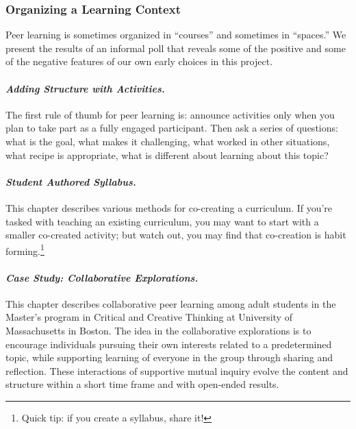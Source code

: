 \hypertarget{organizing-a-learning-context}{%
\subsubsection{Organizing a Learning
Context}\label{organizing-a-learning-context}}

Peer learning is sometimes organized in ``courses'' and sometimes in
``spaces.'' We present the results of an informal poll that reveals some
of the positive and some of the negative features of our own early
choices in this project.

\hypertarget{adding-structure-with-activities.}{%
\paragraph{\texorpdfstring{\emph{Adding Structure with
Activities.}}{Adding Structure with Activities.}}\label{adding-structure-with-activities.}}

The first rule of thumb for peer learning is: announce activities only
when you plan to take part as a fully engaged participant. Then ask a
series of questions: what is the goal, what makes it challenging, what
worked in other situations, what recipe is appropriate, what is
different about learning about this topic?

\hypertarget{student-authored-syllabus.}{%
\paragraph{\texorpdfstring{\emph{Student Authored
Syllabus.}}{Student Authored Syllabus.}}\label{student-authored-syllabus.}}

This chapter describes various methods for co-creating a curriculum. If
you're tasked with teaching an existing curriculum, you may want to
start with a smaller co-created activity; but watch out, you may find
that co-creation is habit forming.\footnote{Quick tip: if you create a
  syllabus, share it!}

\hypertarget{case-study-collaborative-explorations.}{%
\paragraph{\texorpdfstring{\emph{Case Study: Collaborative
Explorations.}}{Case Study: Collaborative Explorations.}}\label{case-study-collaborative-explorations.}}

This chapter describes collaborative peer learning among adult students
in the Master's program in Critical and Creative Thinking at University
of Massachusetts in Boston. The idea in the collaborative explorations
is to encourage individuals pursuing their own interests related to a
predetermined topic, while supporting learning of everyone in the group
through sharing and reflection. These interactions of supportive mutual
inquiry evolve the content and structure within a short time frame and
with open-ended results.

